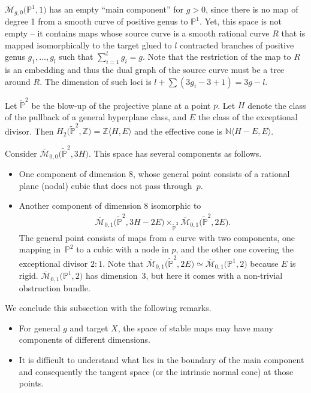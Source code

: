 \documentclass[pdftex]{sigma}
\numberwithin{equation}{section}
\newcommand{\PP}{\mathbb P}
\theoremstyle{plain}
\theoremstyle{definition}
\theoremstyle{remark}
\begin{document}
\begin{Example}$\overline{{\mathcal M}}_{g,0}\big({\mathbb P}^1,1\big)$
has an empty ``main component'' for $g>0$, since there is no map of degree 1 from a smooth curve of positive genus to $\mathbb P^1$. Yet, this space is not empty -- it contains maps whose source curve is a smooth rational curve $R$ that is mapped isomorphically to the target glued to $l$ contracted branches of positive genus $g_1,\ldots,g_l$ such that $\sum\limits_{i=1}^l g_i=g$. Note that the restriction of the map to $R$ is an embedding and thus the dual graph of the source curve must be a tree around $R$. The dimension of such loci is $l+\sum(3g_i-3+1)=3g-l$.
\end{Example}
\begin{Example}
Let $\tilde{\mathbb P}^2$ be the blow-up of the projective plane at a point $p$. Let $H$ denote the class of the pullback of a general hyperplane class, and $E$ the class of the exceptional divisor. Then $H_2\big(\tilde{\mathbb P}^2,\mathbb Z\big)=\mathbb Z\langle H,E\rangle$ and the effective cone is $\mathbb N\langle H-E, E\rangle$.

Consider
$\overline{{\mathcal M}}_{0,0}\big(\tilde{\mathbb P}^2,3H\big)$. This space has several components as follows.
\begin{itemize}\itemsep=0pt
\item One component of dimension 8, whose general point consists of a rational plane (nodal) cubic that does not pass through~$p$.

\item Another component of dimension 8 isomorphic to
\begin{gather*}
\overline{{\mathcal M}}_{0,1}\big(\tilde{\mathbb P}^2,3H-2E\big)
\times_{\tilde{\mathbb P}^2}
\overline{{\mathcal M}}_{0,1}\big(\tilde{\mathbb P}^2,2E\big).
\end{gather*} The general point consists of maps from a curve with two components, one mapping in~$\PP^2$ to a cubic with a node in $p$, and the other one covering the exceptional divisor $2:1$. Note that $\overline{{\mathcal M}}_{0,1}\big(\tilde{\mathbb P}^2,2E\big)
\simeq \overline{{\mathcal M}}_{0,1}\big({\mathbb P}^1,2\big) $ because $E$ is rigid. $
\overline{{\mathcal M}}_{0,1}\big({\mathbb P}^1,2\big)$ has dimension~3, but here it comes with a non-trivial obstruction bundle.
\end{itemize}
\end{Example}
\begin{Remark}We conclude this subsection with the following remarks.
\begin{itemize}\itemsep=0pt
 \item For general $g$ and target $X$, the space of stable maps may have many components of different dimensions.
 \item It is difficult to understand what lies in the boundary of the main component and consequently the tangent space (or the intrinsic normal cone) at those points.
\end{itemize}
\end{Remark}
\end{document}
